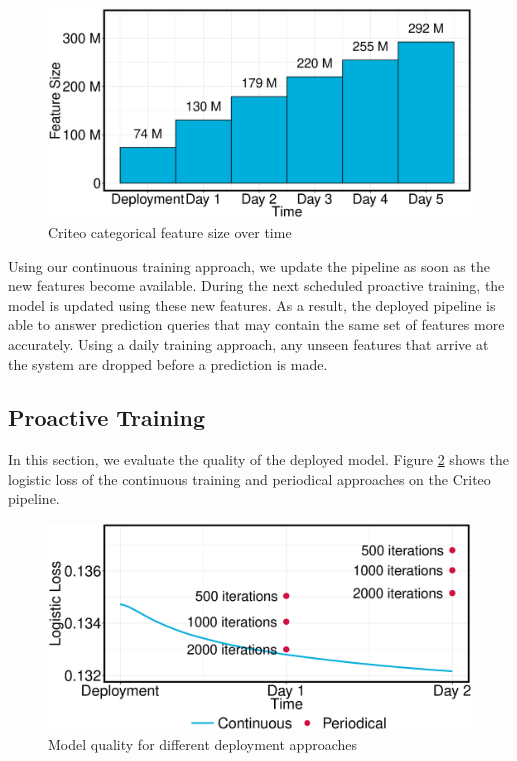 \begin{figure}[h!]
\includegraphics[width=\columnwidth]{../images/experiment-results/criteo-feature-discovery-experiment.eps}
\caption{Criteo categorical feature size over time}
\label{fig:criteo-feature-discovery}
\end{figure}

Using our continuous training approach, we update the pipeline as soon as the new features become available.
During the next scheduled proactive training, the model is updated using these new features.
As a result, the deployed pipeline is able to answer prediction queries that may contain the same set of features more accurately.
Using a daily training approach, any unseen features that arrive at the system are dropped before a prediction is made.

\subsection{Proactive Training}\label{subsec:proactive-training}
In this section, we evaluate the quality of the deployed model.
Figure \ref{fig:loss-proactive-vs-daily} shows the logistic loss of the continuous training and periodical approaches on the Criteo pipeline.

\begin{figure}[h!]
\centering
\includegraphics[width=\columnwidth]{../images/experiment-results/criteo-proactive-training-experiment.eps}
\caption{Model quality for different deployment approaches}
\label{fig:loss-proactive-vs-daily}
\vspace{2mm}
\end{figure}

